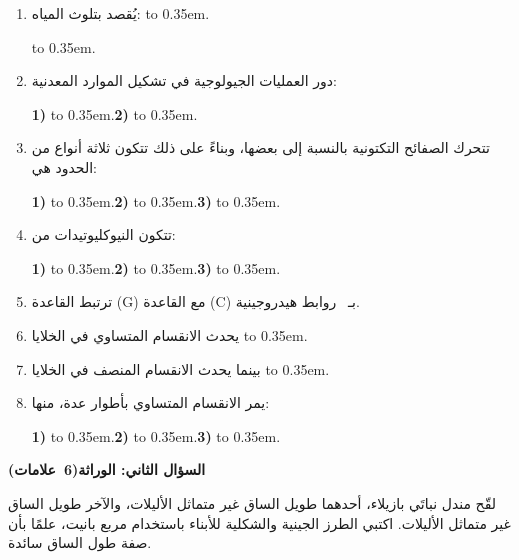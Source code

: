 \documentclass[12pt, a4paper]{article}
\newcommand{\en}[1]{\foreignlanguage{english}{#1}}
\newcommand{\question}[2]{%
  \par\vspace{0.2cm}\noindent
  \colorbox{gray!15}{\parbox{\dimexpr\linewidth-2\fboxsep\relax}{\textbf{\large #1}\hfill\mbox{\textbf{(#2)}}}}%
  \par\vspace{0.12cm}}
\newcommand{\fillline}{\leavevmode\xleaders\hbox to 0.35em{\hss.\hss}\hfill\kern0pt}
\newcommand{\dotline}{\par\vspace{0.2cm}\noindent\fillline\par}
\newcommand{\dotsblank}[1][3.2cm]{\makebox[#1]{\xleaders\hbox to 0.35em{\hss.\hss}\hfill}}
\begin{document}
\begin{enumerate}[label=\textbf{\arabic*-}, itemsep=0.42cm, leftmargin=*]
\item يُقصد بتلوث المياه: \fillline \dotline
\item دور العمليات الجيولوجية في تشكيل الموارد المعدنية: \par\vspace{0.2cm}
\textbf{1)} \fillline \quad \textbf{2)} \fillline
\item تتحرك الصفائح التكتونية بالنسبة إلى بعضها، وبناءً على ذلك تتكون ثلاثة أنواع من الحدود هي: \par\vspace{0.2cm}
\textbf{1)} \fillline \quad \textbf{2)} \fillline \quad \textbf{3)} \fillline
\item تتكون النيوكليوتيدات من: \par\vspace{0.2cm}
\textbf{1)} \fillline \quad \textbf{2)} \fillline \quad \textbf{3)} \fillline
\item ترتبط القاعدة \en{(G)} مع القاعدة \en{(C)} بـ \dotsblank\ روابط هيدروجينية.
\item يحدث الانقسام المتساوي في الخلايا \fillline
\item بينما يحدث الانقسام المنصف في الخلايا \fillline
\item يمر الانقسام المتساوي بأطوار عدة، منها: \par\vspace{0.2cm}
\textbf{1)} \fillline \quad \textbf{2)} \fillline \quad \textbf{3)} \fillline
\end{enumerate}

\newpage
\question{السؤال الثاني: الوراثة}{6 علامات}

لقّح مندل نباتَي بازيلاء، أحدهما طويل الساق غير متماثل الأليلات، والآخر طويل الساق غير متماثل الأليلات.
اكتبي الطرز الجينية والشكلية للأبناء باستخدام مربع بانيت، علمًا بأن صفة طول الساق سائدة.
\end{document}
